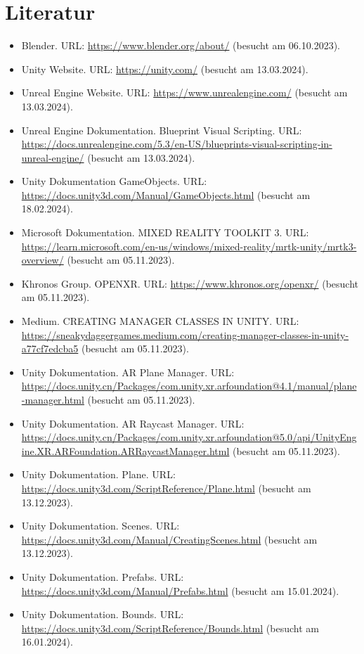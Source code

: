 \chapter{Literatur}

\begin{itemize}
    \item Blender. URL: \url{https://www.blender.org/about/} (besucht am 06.10.2023).
    \item Unity Website. URL: \url{https://unity.com/} (besucht am 13.03.2024).
    \item Unreal Engine Website. URL: \url{https://www.unrealengine.com/} (besucht am 13.03.2024).
    \item Unreal Engine Dokumentation. Blueprint Visual Scripting. URL: \url{https://docs.unrealengine.com/5.3/en-US/blueprints-visual-scripting-in-unreal-engine/} (besucht am 13.03.2024).
    \item Unity Dokumentation GameObjects. URL: \url{https://docs.unity3d.com/Manual/GameObjects.html} (besucht am 18.02.2024).
    \item Microsoft Dokumentation. MIXED REALITY TOOLKIT 3. URL: \url{https://learn.microsoft.com/en-us/windows/mixed-reality/mrtk-unity/mrtk3-overview/} (besucht am 05.11.2023).
    \item Khronos Group. OPENXR. URL: \url{https://www.khronos.org/openxr/} (besucht am 05.11.2023).
    \item Medium. CREATING MANAGER CLASSES IN UNITY. URL: \url{https://sneakydaggergames.medium.com/creating-manager-classes-in-unity-a77cf7edcba5} (besucht am 05.11.2023).
    \item Unity Dokumentation. AR Plane Manager. URL: \url{https://docs.unity.cn/Packages/com.unity.xr.arfoundation@4.1/manual/plane-manager.html} (besucht am 05.11.2023).
    \item Unity Dokumentation. AR Raycast Manager. URL: \url{https://docs.unity.cn/Packages/com.unity.xr.arfoundation@5.0/api/UnityEngine.XR.ARFoundation.ARRaycastManager.html} (besucht am 05.11.2023).
    \item Unity Dokumentation. Plane. URL: \url{https://docs.unity3d.com/ScriptReference/Plane.html} (besucht am 13.12.2023).
    \item Unity Dokumentation. Scenes. URL: \url{https://docs.unity3d.com/Manual/CreatingScenes.html} (besucht am 13.12.2023).
    \item Unity Dokumentation. Prefabs. URL: \url{https://docs.unity3d.com/Manual/Prefabs.html} (besucht am 15.01.2024).
    \item Unity Dokumentation. Bounds. URL: \url{https://docs.unity3d.com/ScriptReference/Bounds.html} (besucht am 16.01.2024).

\end{itemize}
